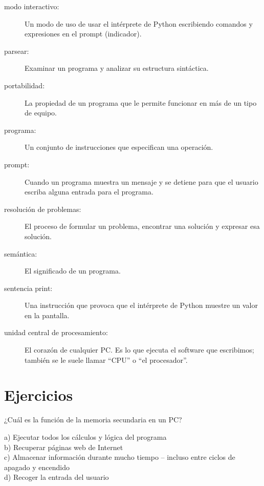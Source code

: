 \begin{description}
\item[modo interactivo:] Un modo de uso de usar el intérprete de Python
escribiendo comandos y expresiones en el prompt (indicador).

\item[parsear:] Examinar un programa y analizar su estructura sintáctica.

\item[portabilidad:]  La propiedad de un programa que le permite funcionar en más
de un tipo de equipo.

\item[programa:] Un conjunto de instrucciones que especifican una operación.

\item[prompt:] Cuando un programa muestra un mensaje y se detiene para que
el usuario escriba alguna entrada para el programa.

\item[resolución de problemas:]  El proceso de formular un problema, encontrar
una solución y expresar esa solución.

\item[semántica:] El significado de un programa.

\item[sentencia print:]  Una instrucción que provoca que el intérprete de Python
muestre un valor en la pantalla.

\item[unidad central de procesamiento:] El corazón de cualquier PC. Es lo que
ejecuta el software que escribimos; también se le suele llamar ``CPU'' o ``el procesador''.

\end{description}

\section{Ejercicios}


\begin{ex}
¿Cuál es la función de la memoria secundaria en un PC?

a) Ejecutar todos los cálculos y lógica del programa\\
b) Recuperar páginas web de Internet\\
c) Almacenar información durante mucho tiempo -- incluso entre ciclos de apagado y encendido\\
d) Recoger la entrada del usuario
\end{ex}

